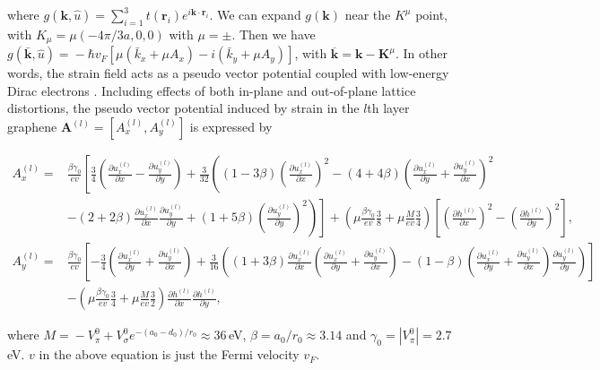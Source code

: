 \documentclass[aps,prx,10pt,twocolumn,superscriptaddress]{revtex4}
\begin{document}
where $g(\textbf{k},\hat{u})\!=\!\sum^{3}_{i=1}t(\textbf{r}_{i})e^{i\textbf{k}\cdot\textbf{r}_{i}}$. We can expand $g(\textbf{k})$ near the $K^{\mu}$ point, with $K_{\mu}\!=\!\mu(-4\pi/3a,0,0)$ with $\mu=\pm$. Then we have $g(\bar{\textbf{k}},\hat{u})\!=\!-\hbar v_{F}[\mu(\bar{k}_{x}+\mu A_{x})-i(\bar{k}_{y}+\mu A_{y})]$, with $\overline{\textbf{k}}\!=\!\textbf{k}-\textbf{K}^{\mu}$. In other words, the strain field acts as a pseudo vector potential coupled with low-energy Dirac electrons \cite{castro-neto-strain-prl09}.
Including effects of both in-plane  and out-of-plane lattice distortions, the pseudo vector potential induced by strain in the $l$th layer graphene $\mathbf{A}^{(l)}=[A_x^{(l)}, A_y^{(l)}]$ is expressed by
\begin{widetext}
\allowdisplaybreaks
\begin{align}
A_{x}^{(l)}=&\frac{\beta\gamma_{0}}{ev}\left[\frac{3}{4}(\frac{\partial u^{(l)}_{x}}{\partial x}-\frac{\partial u^{(l)}_{y}}{\partial y})+\frac{3}{32}\left((1-3\beta)\left(\frac{\partial u^{(l)}_{x}}{\partial x}\right)^{2}-(4+4\beta)\left(\frac{\partial u^{(l)}_{x}}{\partial y}+\frac{\partial u^{(l)}_{y}}{\partial x}\right)^{2}\right.\right.\nonumber\\
&\left.\left.-(2+2\beta)\frac{\partial u^{(l)}_{x}}{\partial x}\frac{\partial u^{(l)}_{y}}{\partial y}+(1+5\beta)\left(\frac{\partial u^{(l)}_{y}}{\partial y}\right)^{2}\right)\right]\nonumber+\left(\mu\frac{\beta\gamma_{0}}{ev}\frac{3}{8}+\mu\frac{M}{ev}\frac{3}{4}\right)\left[\left(\frac{\partial h^{(l)}}{\partial x}\right)^{2}-\left(\frac{\partial h^{(l)}}{\partial y}\right)^{2}\right],\nonumber\\
A_{y}^{(l)}=&\frac{\beta\gamma_{0}}{ev}\left[-\frac{3}{4}\left(\frac{\partial u^{(l)}_{x}}{\partial y}+\frac{\partial u^{(l)}_{y}}{\partial x}\right)+\frac{3}{16}\left((1+3\beta)\frac{\partial u^{(l)}_{x}}{\partial x}\left(\frac{\partial u^{(l)}_{x}}{\partial y}+\frac{\partial u^{(l)}_{y}}{\partial x}\right)-(1-\beta)\left(\frac{\partial u^{(l)}_{x}}{\partial y}+\frac{\partial u^{(l)}_{y}}{\partial x}\right)\frac{\partial u^{(l)}_{y}}{\partial y}\right)\right]\nonumber\\
&-\left(\mu\frac{\beta\gamma_{0}}{ev}\frac{3}{4}+\mu\frac{M}{ev}\frac{3}{2}\right)\frac{\partial h^{(l)}}{\partial x}\frac{\partial h^{(l)}}{\partial y},
\label{eq:Avec}
\end{align}
\end{widetext}
where $M\!=\!-V^{0}_{\pi}+V^{0}_{\sigma}e^{-(a_{0}-d_{0})/r_{0}}\!\approx\!36\,$eV, $\beta\!=\!a_0/r_0\!\approx\!3.14$ and $\gamma_{0}=\left|V^{0}_{\pi}\right|\!=\!2.7\,$eV. $v$ in the above equation is just the Fermi velocity $v_F$.
\end{document}

